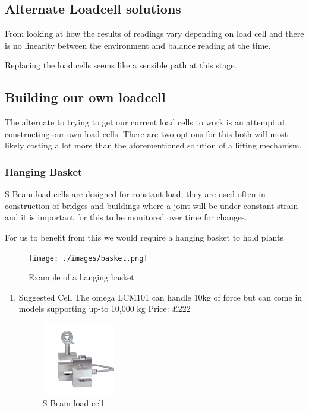 \documentclass[11pt]{article}
\begin{document}
\begin{enumerate}
\section{Alternate Loadcell solutions}
\label{sec-2}

From looking at how the results of readings vary depending on load cell and there is no linearity between the environment 
and balance reading at the time. 

Replacing the load cells seems like a sensible path at this stage.  

\subsection{Building our own loadcell}
\label{sec-2-1}

The alternate to trying to get our current load cells to work is an attempt at constructing our own load cells. There are two options 
for this both will most likely costing a lot more than the aforementioned solution of a lifting mechanism. 

\subsubsection{Hanging Basket}
\label{sec-2-1-1}

S-Beam load cells are designed for constant load, they are used often in construction of bridges and buildings where a joint will be under constant strain
and it is important for this to be monitored over time for changes. 

For us to benefit from this we would require a hanging basket to hold plants 
\begin{figure}[htb]
\centering
\texttt{[image: ./images/basket.png]}
\caption{\label{fig:Hanging-Basket}Example of a hanging basket}
\end{figure}


\begin{enumerate}
\item Suggested Cell
\label{sec-2-1-1-1}
The omega LCM101 can handle 10kg of force but can come in models supporting up-to 10,000 kg
Price: £222
\begin{figure}[htb]
\centering
\includegraphics[width=120px]{./images/sbeam.jpg}
\caption{\label{fig:S-Beam}S-Beam load cell}
\end{figure}
\end{enumerate}


\end{enumerate}
\end{document}
